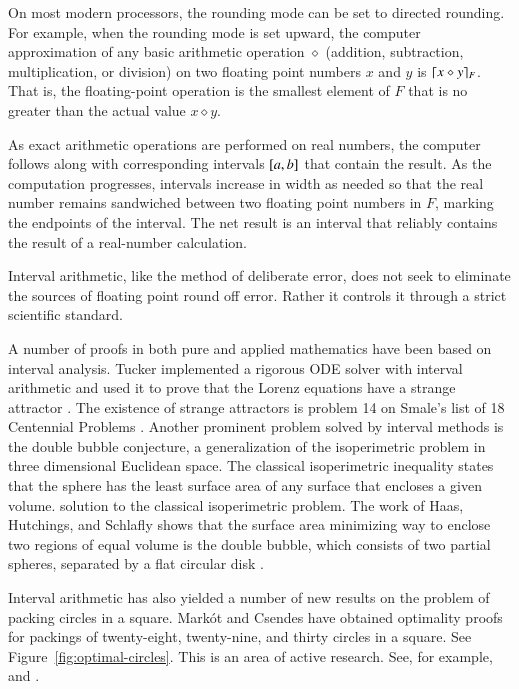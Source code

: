 On most modern processors, the rounding mode can be set to directed
rounding.  For example, when the rounding mode is set upward, the
computer approximation of any basic arithmetic operation $\diamond$
(addition, subtraction, multiplication, or division) on two floating
point numbers $x$ and $y$ is $\lceil x\diamond y\rceil_F$.  That is, the
floating-point operation is the smallest element of $F$ that is no
greater than the actual value $x\diamond y$.

As exact arithmetic operations are performed on real numbers, the
computer follows along with corresponding intervals $[
a,b]$ that contain the result.  As the computation
progresses, intervals increase in width as needed so that the real
number remains sandwiched between two floating point numbers in $F$, marking
the endpoints of the interval.
The net result is an interval that reliably contains the result of a
real-number calculation.

Interval arithmetic, like the method of deliberate error, does not
seek to eliminate the sources of floating point round off error.
Rather it controls it through a strict scientific standard.


A number of proofs in both pure and applied mathematics have been
based on interval analysis.  Tucker implemented a rigorous ODE
solver with interval arithmetic and used it to prove that the Lorenz
equations have a strange attractor \cite{Tuc02}. The existence of
strange attractors is problem 14 on Smale's list of 18 Centennial
Problems \cite{Sma98}.  Another prominent problem solved by interval
methods is the double bubble conjecture, a generalization of the
isoperimetric problem in three dimensional Euclidean space.  The
classical isoperimetric inequality states that the sphere has the
least surface area of any surface that encloses a given volume.
solution to the classical isoperimetric problem.  The work of Haas,
Hutchings, and Schlafly shows that the surface area minimizing
way to enclose two regions of equal volume is the double bubble, which
consists of two partial spheres, separated by a flat circular disk
\cite{HHS95}.

Interval arithmetic has also yielded a number of new results on the
problem of packing circles in a square.  Mark\'ot and Csendes
have obtained optimality proofs for packings of twenty-eight, twenty-nine, and thirty
circles in a square.  See Figure~\ref{fig:optimal-circles}.  This is
an area of active research. See, for example, \cite{Sza07} and
\cite{Mark07}.


